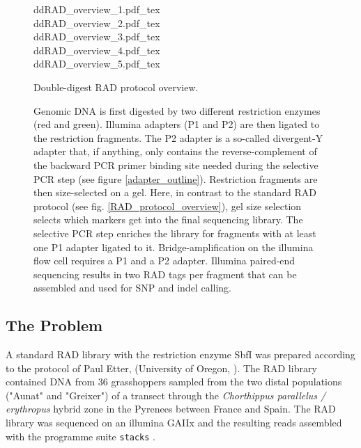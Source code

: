 \documentclass[a4paper,12pt,times,print,index,custombib,custommargin]{PhDThesisPSnPDF}\usepackage[]{graphicx}\usepackage[]{color}
\begin{document}
\begin{figure}
\def\svgwidth{.9\textwidth}
{ddRAD_overview_1.pdf_tex}\\ 
\def\svgwidth{\textwidth}
{ddRAD_overview_2.pdf_tex}\\
\def\svgwidth{.9\textwidth}
{ddRAD_overview_3.pdf_tex}\\
\def\svgwidth{.9\textwidth}
{ddRAD_overview_4.pdf_tex}\\
\def\svgwidth{.9\textwidth}
{ddRAD_overview_5.pdf_tex}
\caption[Double-digest RAD protocol overview.]{Double-digest RAD protocol overview.}
\label{ddRAD_protocol_overview}
\end{figure}

\begin{figure}[t]
\ContinuedFloat
\caption[]{Genomic DNA is first digested by two different restriction enzymes (red and green). Illumina adapters (P1 and P2) are then ligated to the restriction fragments. The P2 adapter is a so-called divergent-Y adapter that, if anything, only contains the reverse-complement of the backward PCR primer binding site needed during the selective PCR step (see figure \ref{adapter_outline}). Restriction fragments are then size-selected on a gel. Here, in contrast to the standard RAD protocol (see fig. \ref{RAD_protocol_overview}), gel size selection selects which markers get into the final sequencing library. The selective PCR step enriches the library for fragments with at least one P1 adapter ligated to it. Bridge-amplification on the illumina flow cell requires a P1 and a P2 adapter. Illumina paired-end sequencing results in two RAD tags per fragment that can be assembled and used for SNP and indel calling.}
\end{figure}


\subsection{The Problem}

A standard RAD library with the restriction enzyme \gls{SbfI} was prepared according to the protocol of Paul Etter, (University of Oregon, \citealt{Baird2008}). The RAD library contained DNA from 36 grasshoppers sampled from the two distal populations ("Aunat" and "Greixer") of a transect through the \textit{Chorthippus parallelus / erythropus} hybrid zone in the Pyrenees between France and Spain. The RAD library was sequenced on an illumina GAIIx and the resulting reads assembled with the programme suite \texttt{stacks} \citep{Catchen2011}.
\end{document}
